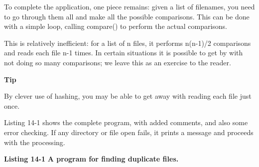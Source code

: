 
To complete the application, one piece remains: given a list of
filenames, you need to go through them all and make all the possible
comparisons. This can be done with a simple loop, calling
\textsf{compare()} to perform the actual comparisons. 


This is relatively inefficient: for a list of n files, it performs
n(n-1)/2 comparisons and reads each file n-1 times. In certain
situations it is possible to get by with not doing so many comparisons;
we leave this as an exercise to the reader.

{\sffamily\bfseries
Tip}

{\sffamily
By clever use of hashing, you may be able to get away with reading each
file just once.}

Listing 14-1 shows the complete program, with added comments, and also
some error checking. If any directory or file open fails, it prints a
message and proceeds with the processing.

\bigskip

{\sffamily\bfseries Listing 14-1}
{\sffamily\bfseries A program for finding duplicate files.}

